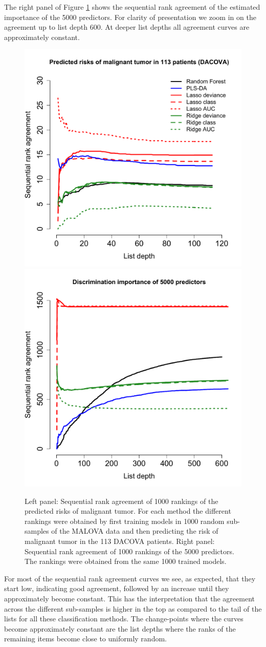 \documentclass[12pt,a4paper]{article}
\theoremstyle{plain}
\begin{document}
The right panel of Figure \ref{fig:app1} shows the sequential rank
agreement of the estimated importance of the 5000 predictors.  For
clarity of presentation we zoom in on the agreement up to list depth
600. At deeper list depths all agreement curves are approximately constant.


\begin{figure}[htbp]
\begin{center}
\includegraphics[width=.49\textwidth]{pics/riskAgreementPlot}%
\includegraphics[width=.49\textwidth]{pics/predictorAgreementPlot}
\end{center}
\caption{Left panel: Sequential rank agreement of 1000 rankings of the
  predicted risks of malignant tumor. For each method the different
  rankings were obtained by first training models in 1000 random
  sub-samples of the MALOVA data and then predicting the risk of
  malignant tumor in the 113 DACOVA patients. Right panel: Sequential
  rank agreement of 1000 rankings of the 5000 predictors. The rankings
  were obtained from the same 1000 trained models.}
 \label{fig:app1}
\end{figure}

For most of the sequential rank agreement curves we see, as expected,
that they start low, indicating good agreement, followed by an
increase until they approximately become constant. This has the
interpretation that the agreement across the different sub-samples is
higher in the top as compared to the tail of the lists for all these
classification methods. The change-points where the curves become
approximately constant are the list depths where the ranks of the
remaining items become close to uniformly random.
\end{document}
